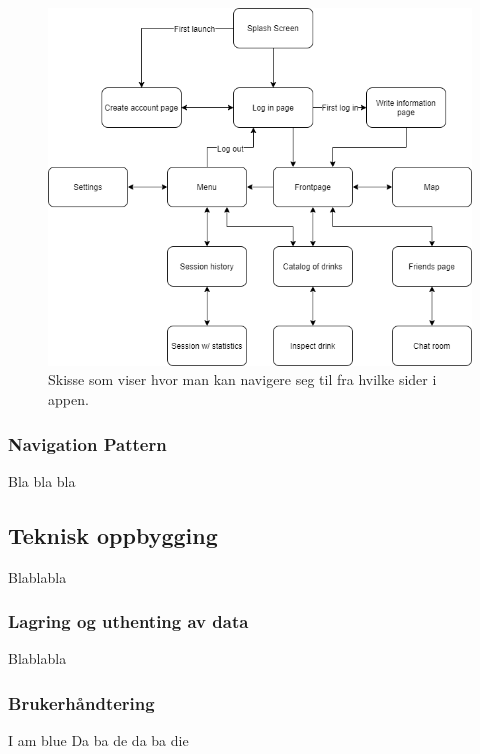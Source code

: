     \begin{figure}[H]
        \centering
        \includegraphics[scale=0.5]{images/lille_promille_float_diagram.drawio.png}
        \caption{Skisse som viser hvor man kan navigere seg til fra hvilke sider i appen.}
    \end{figure}

    \subsubsection{Navigation Pattern}
    Bla bla bla

\subsection{Teknisk oppbygging}
Blablabla

    \subsubsection{Lagring og uthenting av data}
    Blablabla

    \subsubsection{Brukerhåndtering}
    I am blue
    Da ba de da ba die
